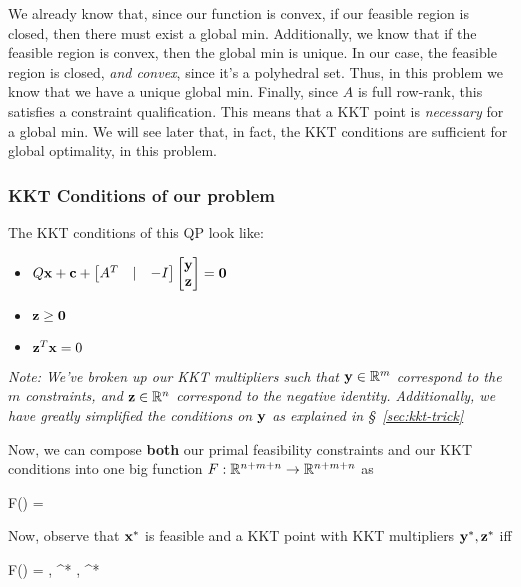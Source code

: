 We already know that, since our function is convex, if our feasible region is 
closed, then there must exist a global min. Additionally, we know that if the
feasible region is convex, then the global min is unique.
In our case, the feasible region is closed, \textit{and convex}, since it's a
polyhedral set. Thus, in this problem we know that we have a unique global min.
Finally, since $A$ is full row-rank, this satisfies a constraint qualification.
This means that a KKT point is \textit{necessary} for a global min. We will see
later that, in fact, the KKT conditions are sufficient for global optimality,
in this problem.

\subsubsection{KKT Conditions of our problem}
The KKT conditions of this QP look like:
\begin{itemize}
	\item $Q\mathbf{x} + \mathbf{c} + \begin{bmatrix} A^T & | & -I \end{bmatrix}\begin{bmatrix} \mathbf{y} \\ \mathbf{z} \end{bmatrix} = \mathbf{0}$
	\item $\mathbf{z} \geq \mathbf{0}$ 
	\item $\mathbf{z}^T\mathbf{x} = 0$ 
\end{itemize}
\textit{Note: We've broken up our KKT multipliers such that $\mathbf{y} \in \mathbb{R}^m$ correspond
to the $m$ constraints, and $\mathbf{z} \in \mathbb{R}^n$ correspond to the negative identity.
Additionally, we have greatly simplified the conditions on $\mathbf{y}$ as explained in
\S~\ref{sec:kkt-trick}}

Now, we can compose \textbf{both} our primal feasibility constraints and our KKT
conditions into one big function $F : \mathbb{R}^{n + m + n} \rightarrow \mathbb{R}^{n + m + n}$
as
\begin{frml}
	F(\mat{\vx \\ \vy \\ \vz}) = 
\end{frml}

Now, observe that $\mathbf{x}^*$ is feasible and a KKT point with KKT multipliers $\mathbf{y}^*, \mathbf{z}^*$
iff 
\begin{frml}
	F(\mat{\vx^* \\ \vy^* \\ \vz^*}) = \vzero, \;  \vx^* \geq \vzero , \;  \; \vz^* \geq \vzero
\end{frml}

